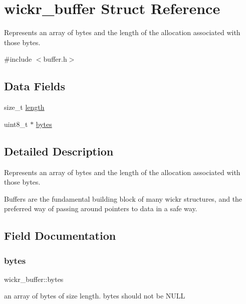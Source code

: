 \hypertarget{structwickr__buffer}{}\section{wickr\+\_\+buffer Struct Reference}
\label{structwickr__buffer}


Represents an array of bytes and the length of the allocation associated with those bytes.  




{\ttfamily \#include $<$buffer.\+h$>$}

\subsection*{Data Fields}
\begin{DoxyCompactItemize}
\item 
size\+\_\+t \hyperlink{structwickr__buffer_a8472d93dd98cfe6f98740a42ae16c86b}{length}
\item 
uint8\+\_\+t $\ast$ \hyperlink{structwickr__buffer_a892763a6b3cbe227c4015f948acbc2bf}{bytes}
\end{DoxyCompactItemize}


\subsection{Detailed Description}
Represents an array of bytes and the length of the allocation associated with those bytes. 

Buffers are the fundamental building block of many wickr structures, and the preferred way of passing around pointers to data in a safe way. 

\subsection{Field Documentation}
\mbox{\label{structwickr__buffer_a892763a6b3cbe227c4015f948acbc2bf}} 
\subsubsection{\texorpdfstring{bytes}{bytes}}
{\footnotesize\ttfamily wickr\+\_\+buffer\+::bytes}

an array of bytes of size length. bytes should not be N\+U\+LL \mbox{\label{structwickr__buffer_a8472d93dd98cfe6f98740a42ae16c86b}} 
